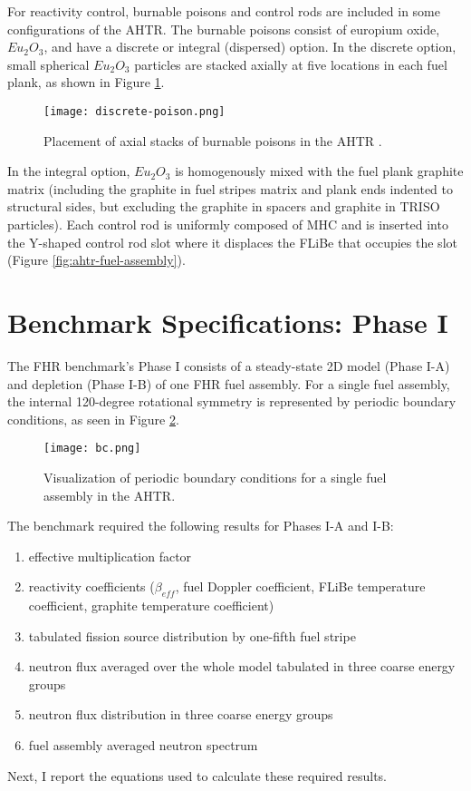 For reactivity control, burnable poisons and control rods are included in 
some configurations of the \gls{AHTR}. 
The burnable poisons consist of europium oxide, $Eu_2O_3$, and have a discrete
or integral (dispersed) option. 
In the discrete option, small spherical $Eu_2O_3$ particles are stacked axially 
at five locations in each fuel plank, as shown in Figure \ref{fig:discrete-poison}. 
\begin{figure}[]
    \centering
    \texttt{[image: discrete-poison.png]} 
    \caption{Placement of axial stacks of burnable poisons in the \acrlong{AHTR} 
    \cite{noauthor_fluoride_nodate}.}
    \label{fig:discrete-poison}
\end{figure}
In the integral option, $Eu_2O_3$ is homogenously mixed with the fuel plank 
graphite matrix (including the graphite in fuel stripes matrix and plank ends 
indented to structural sides, but excluding the graphite in spacers and 
graphite in TRISO particles). 
Each control rod is uniformly composed of \gls{MHC} and is inserted into the 
Y-shaped control rod slot where it displaces the \gls{FLiBe} that occupies the 
slot (Figure \ref{fig:ahtr-fuel-assembly}). 

\section{Benchmark Specifications: Phase I}
\label{sec:phase1}
The \gls{FHR} benchmark's Phase I consists of a steady-state 2D model 
(Phase I-A) and depletion (Phase I-B) of one \gls{FHR} fuel assembly. 
For a single fuel assembly, the internal 120-degree rotational symmetry is 
represented by periodic boundary conditions, as seen in Figure \ref{fig:bc}. 
\begin{figure}[]
    \centering
    \texttt{[image: bc.png]} 
    \caption{Visualization of periodic boundary conditions for a single fuel 
    assembly in the \gls{AHTR}\cite{noauthor_fluoride_nodate}.}
    \label{fig:bc}
\end{figure}
The benchmark required the following results for Phases I-A and I-B:
\begin{enumerate}[label=(\alph*)]
    \item effective multiplication factor 
    \item reactivity coefficients ($\beta_{eff}$, fuel Doppler coefficient, FLiBe 
    temperature coefficient, graphite temperature coefficient)
    \item tabulated fission source distribution by one-fifth fuel stripe
    \item neutron flux averaged over the whole model tabulated in three coarse energy groups
    \item neutron flux distribution in three coarse energy groups
    \item fuel assembly averaged neutron spectrum
\end{enumerate}
Next, I report the equations used to calculate these required results.  

